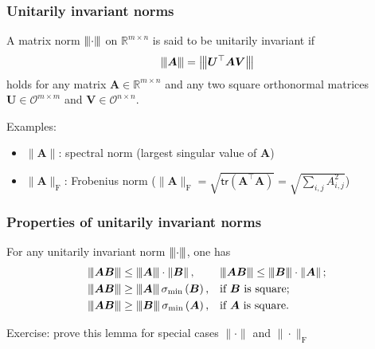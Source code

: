 \documentclass[compress,
mathserif,wide,%
]{beamer}
\begin{document}
\begin{frame}
	\frametitle{Unitarily invariant norms}
	\begin{definition}
A matrix norm ${\left\vert\kern-0.25ex\left\vert\kern-0.25ex\left\vert \cdot \right\vert\kern-0.25ex\right\vert\kern-0.25ex\right\vert}$ on $\mathbb{R}^{m\times n}$ is said to be unitarily invariant if
%
\[
	{\left\vert\kern-0.25ex\left\vert\kern-0.25ex\left\vert \bm{A} \right\vert\kern-0.25ex\right\vert\kern-0.25ex\right\vert}={\big\vert\kern-0.25ex\big\vert\kern-0.25ex\big\vert \bm{U}^{\top}\bm{A}\bm{V} \big\vert\kern-0.25ex\big\vert\kern-0.25ex\big\vert}
\]
%
holds for any matrix $\bm{A}\in\mathbb{R}^{m\times n}$ and any two square orthonormal
matrices $\bm{U}\in\mathcal{O}^{m\times m}$ and $\bm{V}\in\mathcal{O}^{n\times n}$.
\end{definition}

\vfill

Examples: 
	\begin{itemize}
		\item $\|\bm{A}\|$: spectral norm (largest singular value of $\bm{A}$)
	
		\item $\|\bm{A}\|_{\mathrm{F}}$: Frobenius norm ($\|\bm{A}\|_{\mathrm{F}}= \sqrt{\mathsf{tr}(\bm{A}^{\top}\bm{A})}=\sqrt{\sum_{i,j}A_{i,j}^2}$)
	\end{itemize}
\end{frame}

\begin{frame}
	\frametitle{Properties of unitarily invariant norms}
\begin{lemma}
\label{prop:unitary_norm_relation}
For any unitarily invariant norm ${\left\vert\kern-0.25ex\left\vert\kern-0.25ex\left\vert \cdot \right\vert\kern-0.25ex\right\vert\kern-0.25ex\right\vert}$, one has 
%
\begin{align*}
\vertiii{\bm{A}\bm{B}} & \leq\vertiii{\bm{A}} \cdot  \left\Vert \bm{B}\right\Vert, &  & \vertiii{\bm{A}\bm{B}}\leq\vertiii{\bm{B}} \cdot \left\Vert \bm{A}\right\Vert; \\
\vertiii{\bm{A}\bm{B}} & \geq\vertiii{\bm{A}} \, \sigma_{\min}\left(\bm{B}\right), &  & \text{if }\bm{B} \text{ is square}; \\
\vertiii{\bm{A}\bm{B}}& \geq\vertiii{\bm{B}} \, \sigma_{\min}\left(\bm{A}\right), & & \text{if }\bm{A} \text{ is square}. 
\end{align*}
%
\end{lemma}

\vfill
{\footnotesize Exercise: prove this lemma for special cases $\|\cdot\|$ and $\|\cdot\|_{\mathrm{F}}$}
\end{frame}
\end{document}
